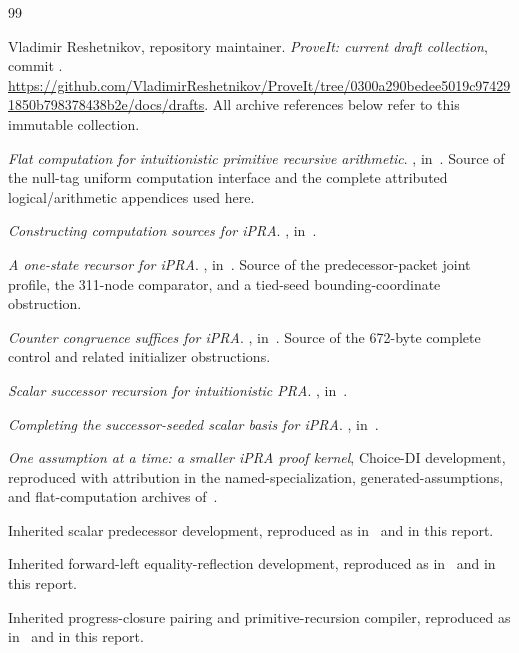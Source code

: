 \clearpage
\begin{thebibliography}{99}
\raggedright
{}
Vladimir Reshetnikov, repository maintainer.
\emph{ProveIt: current draft collection}, commit
.
\url{https://github.com/VladimirReshetnikov/ProveIt/tree/0300a290bedee5019c974291850b798378438b2e/docs/drafts}.
All archive references below refer to this immutable collection.

\emph{Flat computation for intuitionistic primitive recursive arithmetic}.
, in~\cite{snapshot}.
Source of the null-tag uniform computation interface and the complete
attributed logical/arithmetic appendices used here.

\emph{Constructing computation sources for iPRA}.
, in~\cite{snapshot}.

\emph{A one-state recursor for iPRA}.
, in~\cite{snapshot}.
Source of the predecessor-packet joint profile, the 311-node comparator,
and a tied-seed bounding-coordinate obstruction.

\emph{Counter congruence suffices for iPRA}.
, in~\cite{snapshot}.
Source of the 672-byte complete control and related initializer obstructions.

\emph{Scalar successor recursion for intuitionistic PRA}.
, in~\cite{snapshot}.

\emph{Completing the successor-seeded scalar basis for iPRA}.
, in~\cite{snapshot}.

\emph{One assumption at a time: a smaller iPRA proof kernel},
Choice-DI development, reproduced with attribution in the named-specialization,
generated-assumptions, and flat-computation archives of~\cite{snapshot}.

Inherited scalar predecessor development, reproduced as
 in~\cite{flat} and in this report.

Inherited forward-left equality-reflection development, reproduced as
 in~\cite{flat} and in this report.

Inherited progress-closure pairing and primitive-recursion compiler,
reproduced as  in~\cite{flat}
and in this report.
\end{thebibliography}
